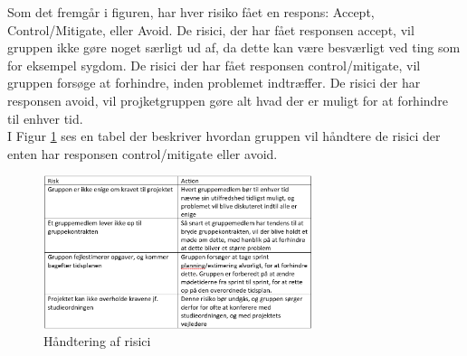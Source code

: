 Som det fremgår i figuren, har hver risiko fået en respons: Accept, Control/Mitigate, eller Avoid. De risici, der har fået responsen accept, vil gruppen ikke gøre
noget særligt ud af, da dette kan være besværligt ved ting som for eksempel sygdom. De risici der har fået responsen control/mitigate, vil gruppen forsøge at forhindre,
inden problemet indtræffer. De risici der har responsen avoid, vil projketgruppen gøre alt hvad der er muligt for at forhindre til enhver tid. \\

I Figur \ref{fig:riskmanagement} ses en tabel der beskriver hvordan gruppen vil håndtere de risici der enten har responsen control/mitigate eller avoid.

\begin{figure}[!h]
    \centering
    \includegraphics[width=0.7\textwidth]{figures/RiskAction.png}
    \caption{Håndtering af risici}
    \label{fig:riskmanagement}
\end{figure}
